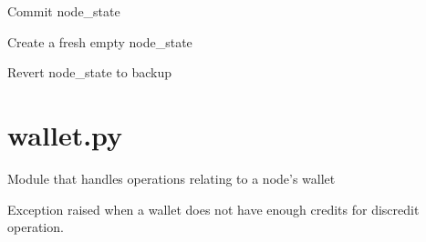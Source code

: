 \documentclass[letterpaper,10pt,english]{sphinxmanual}
\begin{document}

\begin{fulllineitems}
\label{\detokenize{index:node_state.commit_state}}
Commit node\_state

\end{fulllineitems}


\begin{fulllineitems}
\label{\detokenize{index:node_state.fresh_state}}
Create a fresh empty node\_state

\end{fulllineitems}


\begin{fulllineitems}
\label{\detokenize{index:node_state.revert_state}}
Revert node\_state to backup

\end{fulllineitems}

\label{\detokenize{index:module-wallet}}

\section{wallet.py}
\label{\detokenize{index:wallet-py}}
Module that handles operations relating to a node’s wallet

\begin{fulllineitems}
\label{\detokenize{index:wallet.NotEnoughCreditsException}}
Exception raised when a wallet does not have enough credits for
discredit operation.

\end{fulllineitems}
\end{document}
